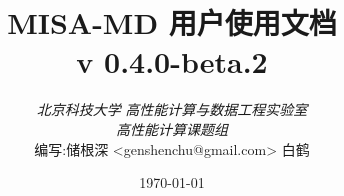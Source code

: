 \begin{titlepage}

    \title{ MISA-MD 用户使用文档 \\
            \large v 0.4.0-beta.2 }
    \author{
    \emph{北京科技大学} \emph{高性能计算与数据工程实验室} \\
    \emph{高性能计算课题组} \\[8cm]
    编写:储根深 <genshenchu@gmail.com> 白鹤 \\
    }

    \date{\today}

    \maketitle
\end{titlepage}